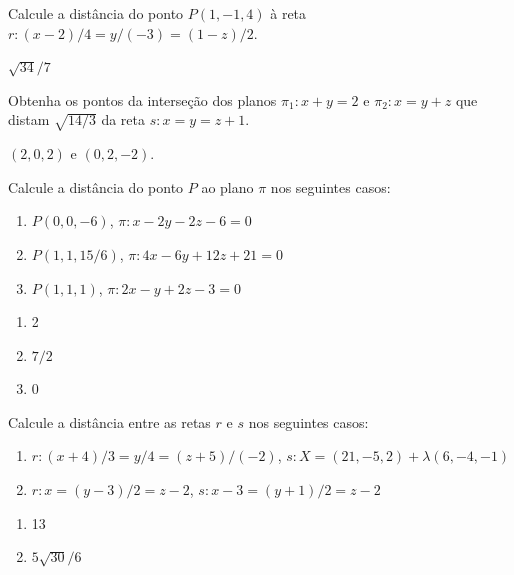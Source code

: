 \documentclass[12pt]{exam}
\begin{document}
\begin{exercicio}
    Calcule a distância do ponto $P(1,-1,4)$ à reta $r : (x - 2)/4 = y/(-3) = (1 - z)/2$.
    \begin{solucao}
        $\sqrt{34}/7$
    \end{solucao}
\end{exercicio}

\begin{exercicio}
    Obtenha os pontos da interseção dos planos $\pi_1 : x + y = 2$ e $\pi_2 : x = y + z$ que distam $\sqrt{14/3}$ da reta $s : x = y = z + 1$.
    \begin{solucao}
        $(2,0,2)$ e $(0,2,-2)$.
    \end{solucao}
\end{exercicio}

\begin{exercicio}
    Calcule a distância do ponto $P$ ao plano $\pi$ nos seguintes casos:
    \begin{enumerate}[label=({\alph*})]
        \item $P(0,0,-6)$, $\pi : x - 2y - 2z - 6 = 0$
        \item $P(1,1,15/6)$, $\pi : 4x - 6y + 12z + 21 = 0$
        \item $P(1,1,1)$, $\pi : 2x - y + 2z - 3 = 0$
    \end{enumerate}
    \begin{solucao}
        \begin{enumerate}[label=({\alph*})]
            \item 2
            \item $7/2$
            \item 0
        \end{enumerate}
    \end{solucao}
\end{exercicio}

\begin{exercicio}
    Calcule a distância entre as retas $r$ e $s$ nos seguintes casos:
    \begin{enumerate}[label=({\alph*})]
        \item $r : (x + 4)/3 = y/4 = (z + 5)/(-2)$, $s : X = (21,-5,2) + \lambda(6,-4,-1)$
        \item $r : x = (y - 3)/2 = z - 2$, $s : x - 3 = (y + 1)/2 = z - 2$
    \end{enumerate}
    \begin{solucao}
        \begin{enumerate}[label=({\alph*})]
            \item 13
            \item $5\sqrt{30}/6$
        \end{enumerate}
    \end{solucao}
\end{exercicio}
\end{document}
